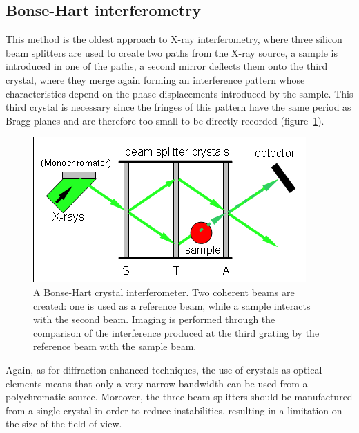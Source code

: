 \subsection{Bonse-Hart interferometry}
This method is the oldest approach to X-ray interferometry, where three
silicon beam splitters are used to create two paths from the X-ray source, a
sample is introduced in one of the paths, a second mirror deflects them onto
the third crystal, where they merge again forming an interference pattern
whose characteristics depend on the phase displacements introduced by the
sample. This third crystal is necessary since the fringes of this pattern
have the same period as Bragg planes and are therefore too small to be
directly recorded (figure~\ref{fig:bonse-hart}).

\begin{figure}[htb]
    \centering
    \includegraphics[width=\textwidth]{gfx/Crystal_interferometer.png}
    \caption[Bonse-Hart interferometer.]{A Bonse-Hart crystal
    interferometer\cn. Two coherent beams are created: one is used as a
reference beam, while a sample interacts with the second beam. Imaging is
performed through the
comparison of the interference produced at the third grating by the
reference beam with the sample beam.}
    \label{fig:bonse-hart}
\end{figure}

Again, as for diffraction enhanced techniques, the use of crystals as
optical elements means that only a very narrow bandwidth can be used from a
polychromatic source. Moreover, the three beam splitters should be
manufactured from a single crystal in order to reduce instabilities,
resulting in a limitation on the size of the field of view.

